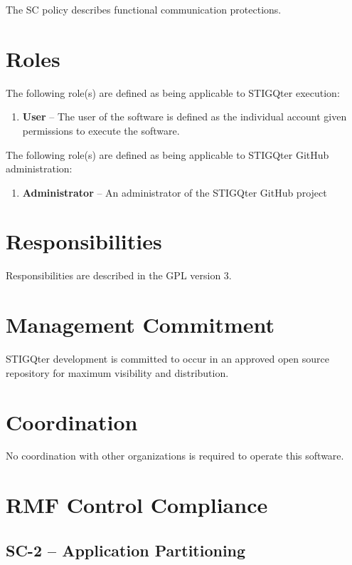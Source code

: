 \documentclass[letterpaper, 10pt, twoside]{article}
\begin{document}
The SC policy describes functional communication protections.

\section{Roles}
\label{sec:roles}

The following role(s) are defined as being applicable to STIGQter execution:
\begin{enumerate}
	\item \textbf{User} -- The user of the software is defined as the individual account given permissions to execute the software.
\end{enumerate}

The following role(s) are defined as being applicable to STIGQter GitHub administration:
\begin{enumerate}
	\item \textbf{Administrator} -- An administrator of the STIGQter GitHub project
\end{enumerate}

\section{Responsibilities}
\label{sec:responsibilities}

Responsibilities are described in the GPL version 3.

\section{Management Commitment}

STIGQter development is committed to occur in an approved open source repository for maximum visibility and distribution.

\section{Coordination}

No coordination with other organizations is required to operate this software.

\section{RMF Control Compliance}

\subsection{SC-2 -- Application Partitioning}
\end{document}
